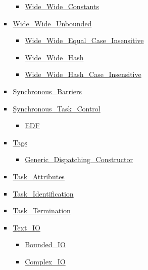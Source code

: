 \begin{multicols*}{\columnnr}
\begin{scriptsize}
\begin{itemize}[leftmargin=0mm]
\begin{itemize}[leftmargin=5mm]
\begin{itemize}[leftmargin=5mm]
\begin{itemize}[leftmargin=5mm]
	  \item[] \href{http://www.ada-auth.org/standards/22rm/html/RM-A-4-8.html}{Wide\_Wide\_Constants}
	  \end{itemize}
	\item[] \href{http://www.ada-auth.org/standards/22rm/html/RM-A-4-8.html}{Wide\_Wide\_Unbounded}
	  \begin{itemize}[leftmargin=5mm]
	  \item[] \href{http://www.ada-auth.org/standards/22rm/html/RM-A-4-8.html}{Wide\_Wide\_Equal\_Case\_Insensitive}
	  \item[] \href{http://www.ada-auth.org/standards/22rm/html/RM-A-4-8.html}{Wide\_Wide\_Hash}
	  \item[] \href{http://www.ada-auth.org/standards/22rm/html/RM-A-4-8.html}{Wide\_Wide\_Hash\_Case\_Insensitive}
	  \end{itemize}
	\item[] \href{http://www.ada-auth.org/standards/22rm/html/RM-D-10-1.html}{Synchronous\_Barriers}
	\item[] \href{http://www.ada-auth.org/standards/22rm/html/RM-D-10.html}{Synchronous\_Task\_Control}
	  \begin{itemize}[leftmargin=5mm]
	  \item[] \href{http://www.ada-auth.org/standards/22rm/html/RM-D-10.html}{EDF}
	  \end{itemize}
	\item[] \href{http://www.ada-auth.org/standards/22rm/html/RM-3-9.html}{Tags}
	  \begin{itemize}[leftmargin=5mm]
	  \item[] \href{http://www.ada-auth.org/standards/22rm/html/RM-3-9.html}{Generic\_Dispatching\_Constructor}
	  \end{itemize}
	\item[] \href{http://www.ada-auth.org/standards/22rm/html/RM-C-7-2.html}{Task\_Attributes}
	\item[] \href{http://www.ada-auth.org/standards/22rm/html/RM-C-7-1.html}{Task\_Identification}
	\item[] \href{http://www.ada-auth.org/standards/22rm/html/RM-C-7-3.html}{Task\_Termination}
	\item[] \href{http://www.ada-auth.org/standards/22rm/html/RM-A-10-1.html}{Text\_IO}
	  \begin{itemize}[leftmargin=5mm]
	  \item[] \href{http://www.ada-auth.org/standards/22rm/html/RM-A-10-11.html}{Bounded\_IO}
	  \item[] \href{http://www.ada-auth.org/standards/22rm/html/RM-G-1-3.html}{Complex\_IO}

\end{itemize}
\end{itemize}
\end{itemize}
\end{itemize}
\end{scriptsize}
\end{multicols*}
